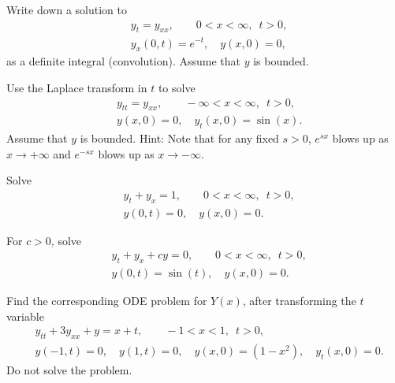 \begin{exercise}
Write down a solution to
\begin{align*}
& y_t = y_{xx}, \qquad 0 < x < \infty, \enspace t > 0,\\
& y_x(0,t) = e^{-t}, \quad y(x,0) = 0 ,
\end{align*}
as a definite integral (convolution).  Assume that $y$ is bounded.
\end{exercise}

\begin{exercise}
Use the Laplace transform in $t$ to solve
\begin{align*}
& y_{tt} = y_{xx}, \qquad -\infty < x < \infty, \enspace t > 0,\\
& y(x,0) = 0, \quad y_t(x,0) = \sin(x) .
\end{align*}
Assume that $y$ is bounded.
Hint: Note that for any fixed $s > 0$,
$e^{sx}$ blows up as $x \to +\infty$
and
$e^{-sx}$ blows up as $x \to -\infty$.
\end{exercise}

\setcounter{exercise}{100}

\begin{exercise}
Solve
\begin{align*}
& y_t + y_x = 1, \qquad 0 < x < \infty, \enspace t > 0,
\\
& y(0,t) = 0, \quad y(x,0) = 0 .
\end{align*}
\end{exercise}

\begin{exercise}
For $c > 0$, solve
\begin{align*}
& y_t + y_x + c y = 0, \qquad 0 < x < \infty, \enspace t > 0,
\\
& y(0,t) = \sin(t), \quad y(x,0) = 0 .
\end{align*}
\end{exercise}

\begin{exercise}
Find the corresponding ODE problem for $Y(x)$, after transforming the $t$
variable
\begin{align*}
& y_{tt} + 3y_{xx} + y = x+t, \qquad -1 < x < 1, \enspace t > 0,
\\
& y(-1,t) = 0, \quad y(1,t) = 0, \quad y(x,0) = (1-x^2) , \quad y_t(x,0) = 0.
\end{align*}
Do not solve the problem.
\end{exercise}

